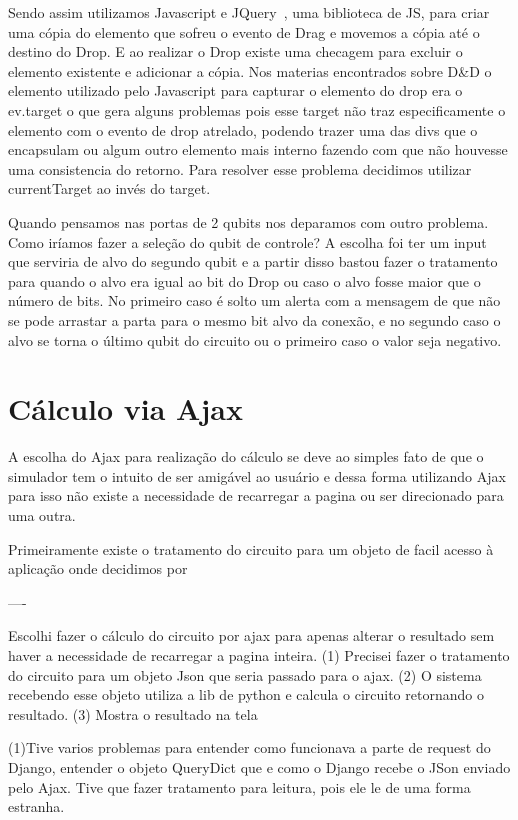 \documentclass[a4paper, 12pt, oneside]{book}
\begin{document}
Sendo assim utilizamos Javascript e JQuery~\cite{jquery}, uma biblioteca de JS, para criar uma cópia do elemento que sofreu o evento de Drag e movemos a cópia até o destino do Drop. E ao realizar o Drop existe uma checagem para excluir o elemento existente e adicionar a cópia. Nos materias encontrados sobre D\&{D} o elemento utilizado pelo Javascript para capturar o elemento do drop era o ev.target o que gera alguns problemas pois esse target não traz especificamente o elemento com o evento de drop atrelado, podendo trazer uma das divs que o encapsulam ou algum outro elemento mais interno fazendo com que não houvesse uma consistencia do retorno. Para resolver esse problema decidimos utilizar currentTarget ao invés do target.

Quando pensamos nas portas de 2 qubits nos deparamos com outro problema. Como iríamos fazer a seleção do qubit de controle? A escolha foi ter um input que serviria de alvo do segundo qubit e a partir disso bastou fazer o tratamento para quando o alvo era igual ao bit do Drop ou caso o alvo fosse maior que o número de bits. No primeiro caso é solto um alerta com a mensagem de que não se pode arrastar a parta para o mesmo bit alvo da conexão, e no segundo caso o alvo se torna o último qubit do circuito ou o primeiro caso o valor seja negativo.

\section{Cálculo via Ajax}

A escolha do Ajax para realização do cálculo se deve ao simples fato de que o simulador tem o intuito de ser amigável ao usuário e dessa forma utilizando Ajax para isso não existe a necessidade de recarregar a pagina ou ser direcionado para uma outra.

Primeiramente existe o tratamento do circuito para um objeto de facil acesso à aplicação onde decidimos por 

----

Escolhi fazer o cálculo do circuito por ajax para apenas alterar o resultado sem haver a necessidade de recarregar a pagina inteira. (1) Precisei fazer o tratamento do circuito para um objeto Json que seria passado para o ajax. (2) O sistema recebendo esse objeto utiliza a lib de python e calcula o circuito retornando o resultado. (3) Mostra o resultado na tela

(1)Tive varios problemas para entender como funcionava a parte de request do Django, entender o objeto QueryDict que e como o Django recebe o JSon enviado pelo Ajax. Tive que fazer tratamento para leitura, pois ele le de uma forma estranha.
\end{document}
